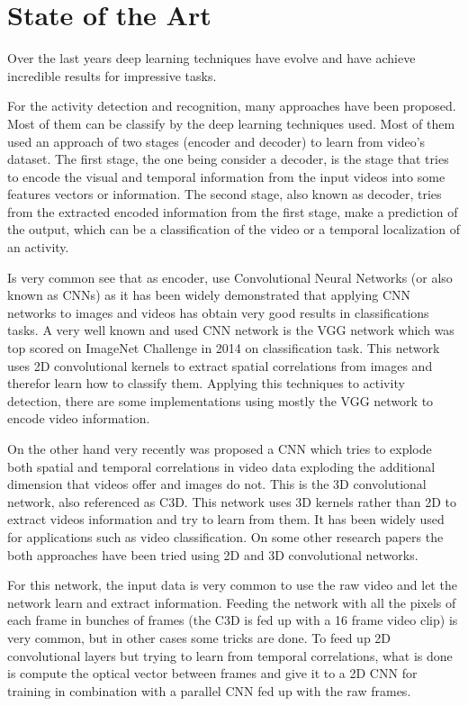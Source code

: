 \chapter{State of the Art}

Over the last years deep learning techniques have evolve and have achieve incredible results for impressive tasks.


For the activity detection and recognition, many approaches have been proposed. Most of them can be classify by the deep learning techniques used. Most of them used an approach of two stages (encoder and decoder) to learn from video's dataset. The first stage, the one being consider a decoder, is the stage that tries to encode the visual and temporal information from the input videos into some features vectors or information. The second stage, also known as decoder, tries from the extracted encoded information from the first stage, make a prediction of the output, which can be a classification of the video or a temporal localization of an activity.

Is very common see that as encoder, use Convolutional Neural Networks (or also known as CNNs) as it has been widely demonstrated that applying CNN networks to images and videos has obtain very good results in classifications tasks. A very well known and used CNN network is the VGG\cite{Simonyan14c} network which was top scored on ImageNet Challenge in 2014 on classification task. This network uses 2D convolutional kernels to extract spatial correlations from images and therefor learn how to classify them. Applying this techniques to activity detection, there are some implementations\cite{simonyan2014two}\cite{yeung2015every}\cite{Ng_2015_CVPR}\cite{ballas2015delving} using mostly the VGG network to encode video information.

On the other hand very recently was proposed a CNN which tries to explode both spatial and temporal correlations in video data exploding the additional dimension that videos offer and images do not. This is the 3D convolutional network, also referenced as C3D\cite{tran2014learning}. This network uses 3D kernels rather than 2D to extract videos information and try to learn from them. It has been widely used\cite{baccouche2011sequential}\cite{tran2015deep}\cite{tran2014learning}\cite{shoutemporal} for applications such as video classification. On some other research papers\cite{Yao_2015_ICCV}\cite{zhang2016modelling} the both approaches have been tried using 2D and 3D convolutional networks.

For this network, the input data is very common to use the raw video and let the network learn and extract information. Feeding the network with all the pixels of each frame in bunches of frames (the C3D is fed up with a 16 frame video clip) is very common, but in other cases some tricks are done. To feed up 2D convolutional layers but trying to learn from temporal correlations, what is done is compute the optical vector between frames and give it to a 2D CNN for training in combination with a parallel CNN fed up with the raw frames\cite{Ng_2015_CVPR}\cite{Yao_2015_ICCV}.

